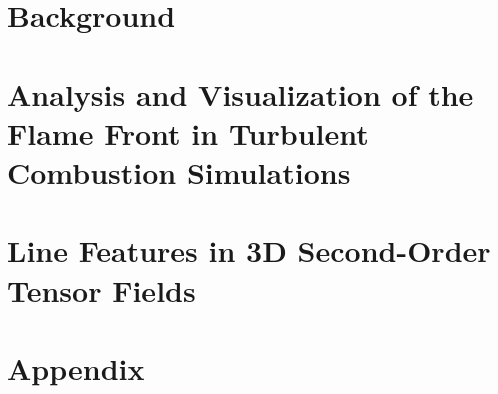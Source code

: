 
%
\part{Background} %
\label{part:background}
%

%

%
%
\part%
        {Analysis and Visualization of the Flame Front
         in Turbulent Combustion Simulations} %
\label{part:flame_vis}
%

%

%

%
%
\part{Line Features in 3D Second-Order Tensor Fields} %
\label{part:tensor_vis}
%

%

%

%
%
\part{Appendix}
\label{part:appendix}
%
\appendix
%

%

%